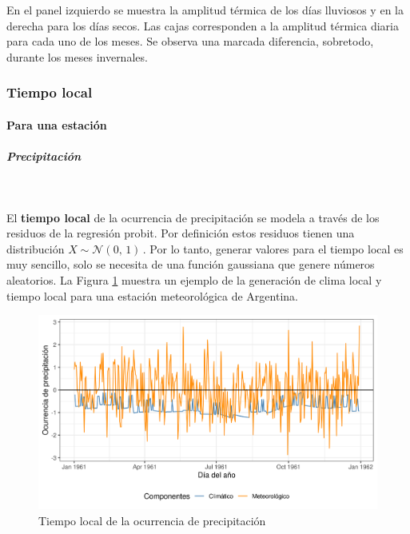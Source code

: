 \documentclass[
  12pt]{article}
\begin{document}
En el panel izquierdo se muestra la amplitud térmica de los días lluviosos y en la derecha para los días secos. Las cajas corresponden a la amplitud térmica diaria para cada uno de los meses. Se observa una marcada diferencia, sobretodo, durante los meses invernales.

\hypertarget{tiempo-local}{%
\subsubsection{Tiempo local}\label{tiempo-local}}

\hypertarget{para-una-estaciuxf3n}{%
\paragraph{Para una estación}\label{para-una-estaciuxf3n}}

\hypertarget{precipitaciuxf3n}{%
\subparagraph{Precipitación}\label{precipitaciuxf3n}}

~

El \textbf{tiempo local} de la ocurrencia de precipitación se modela a través de los residuos de la regresión probit. Por definición estos residuos tienen una distribución \(X \sim \mathcal{N}(0,\,1)\,\). Por lo tanto, generar valores para el tiempo local es muy sencillo, solo se necesita de una función gaussiana que genere números aleatorios. La Figura \ref{fig:ruido-precipitacion} muestra un ejemplo de la generación de clima local y tiempo local para una estación meteorológica de Argentina.

\begin{figure}[H]

{\centering \includegraphics[width=0.75\linewidth]{./docs/figures/ruido_precipitacion} 

}

\caption{Tiempo local de la ocurrencia de precipitación}\label{fig:ruido-precipitacion}
\end{figure}
\end{document}
